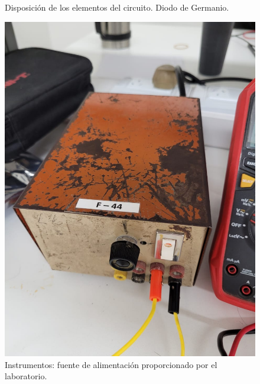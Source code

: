 \documentclass[chaptersright]{informeutn}
\begin{document}
\begin{figure}[H]
\begin{minipage}{0.5\textwidth}
            \caption{Disposición de los elementos del circuito. Diodo de Germanio.}
            \label{fig:germanio}
        \end{minipage}
    \end{figure}
    \begin{figure}[H]
        \centering
        \begin{minipage}{0.3\textwidth}
            \centering
            \includegraphics[width=\textwidth]{pictures/fuentealim.jpeg}
            \caption{Instrumentos: fuente de alimentación proporcionado por el laboratorio.}
        \end{minipage}
        \hspace{0.05\textwidth} %
        \begin{minipage}{0.3\textwidth}
            \centering

\end{minipage}
\end{figure}
\end{document}
